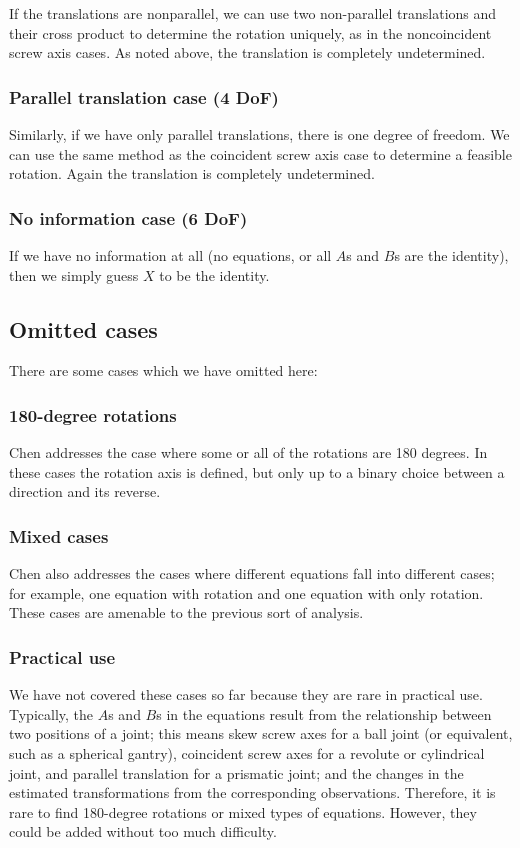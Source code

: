 If the translations are nonparallel, we can use two non-parallel translations and their cross product to
determine the rotation uniquely, as in the noncoincident screw axis cases. 
As noted above, the translation is completely undetermined.

\subsubsection{Parallel translation case (4 DoF)}

Similarly, if we have only parallel translations, there is one degree of freedom. 
We can use the same method as the coincident screw axis case to determine a feasible rotation.
Again the translation is completely undetermined.

\subsubsection{No information case (6 DoF)}

If we have no information at all (no equations, or all $A$s and $B$s are the identity), then we
simply guess $X$ to be the identity.

\subsection{Omitted cases}

There are some cases which we have omitted here:

\subsubsection{180-degree rotations}

Chen \cite{Chen1991} addresses the case where some or all of the rotations are 180 degrees.
In these cases the rotation axis is defined, but only up to a binary choice between a direction
and its reverse.

\subsubsection{Mixed cases}

Chen \cite{Chen1991} also addresses the cases where different equations fall into different cases;
for example, one equation with rotation and one equation with only rotation. These cases
are amenable to the previous sort of analysis.

\subsubsection{Practical use}

We have not covered these cases so far because they are rare in practical use. Typically, the $A$s and $B$s
in the equations result from the relationship between two positions of a joint; this means 
skew screw axes for a ball joint (or equivalent, such as a spherical gantry), 
coincident screw axes for a revolute or cylindrical joint, and parallel translation for a prismatic joint;
and the changes in the estimated transformations from the corresponding observations.
Therefore, it is rare to find 180-degree rotations or mixed types of equations.
However, they could be added without too much difficulty.
